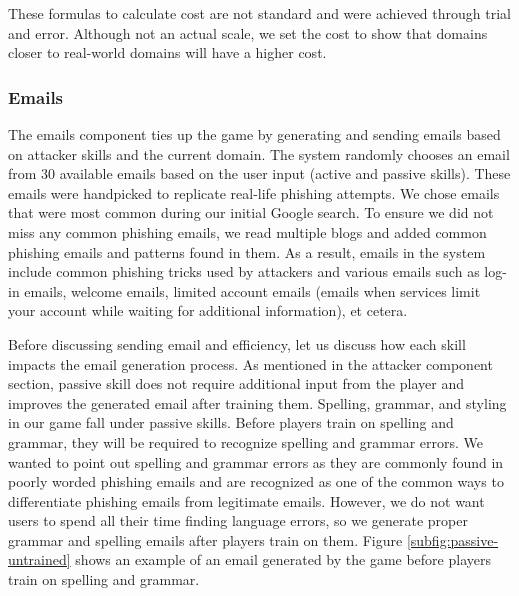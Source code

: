 These formulas to calculate cost are not standard and were achieved through trial and error. Although not an actual scale, we set the cost to show that domains closer to real-world domains will have a higher cost.

\subsubsection{Emails}
The emails component ties up the game by generating and sending emails based on attacker skills and the current domain. The system randomly chooses an email from 30 available emails based on the user input (active and passive skills). These emails were handpicked to replicate real-life phishing attempts. We chose emails that were most common during our initial Google search. To ensure we did not miss any common phishing emails, we read multiple blogs and added common phishing emails and patterns found in them. As a result, emails in the system include common phishing tricks used by attackers and various emails such as log-in emails, welcome emails, limited account emails (emails when services limit your account while waiting for additional information), et cetera.

Before discussing sending email and efficiency, let us discuss how each skill impacts the email generation process. As mentioned in the attacker component section, passive skill does not require additional input from the player and improves the generated email after training them. Spelling, grammar, and styling in our game fall under passive skills. Before players train on spelling and grammar, they will be required to recognize spelling and grammar errors. We wanted to point out spelling and grammar errors as they are commonly found in poorly worded phishing emails and are recognized as one of the common ways to differentiate phishing emails from legitimate emails. However, we do not want users to spend all their time finding language errors, so we generate proper grammar and spelling emails after players train on them. Figure \ref{subfig:passive-untrained} shows an example of an email generated by the game before players train on spelling and grammar.

